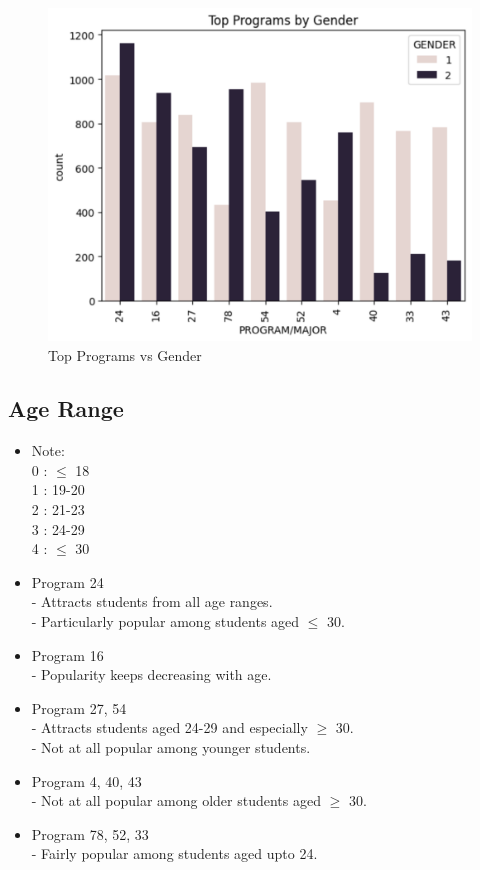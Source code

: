 \documentclass[12pt]{article}
\begin{document}
\begin{figure}[H]
    \centering
    \includegraphics[width=0.7\linewidth]{top_programs_gender.png}
    \caption{Top Programs vs Gender}
\end{figure}

\subsection{Age Range}
\begin{itemize}
    \item Note:\\
    0 : $\leq$ 18\\
    1 : 19-20\\
    2 : 21-23\\
    3 : 24-29\\
    4 : $\leq$ 30
    
    \item Program 24\\
    - Attracts students from all age ranges.\\
    - Particularly popular among students aged $\leq$ 30.

    \item Program 16\\
    - Popularity keeps decreasing with age.

    \item Program 27, 54\\
    - Attracts students aged 24-29 and especially $\geq$ 30.\\
    - Not at all popular among younger students.

    \item Program 4, 40, 43\\
    - Not at all popular among older students aged $\geq$ 30.
    
    \item Program 78, 52, 33\\
    - Fairly popular among students aged upto 24.
\end{itemize}
\end{document}
